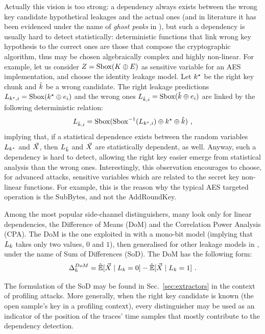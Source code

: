 \begin{remark}\label{rem:ghost}
Actually this vision is too strong: a dependency always exists between the wrong key candidate hypothetical leakages and the actual ones (and in literature it has been evidenced under the name of \emph{ghost peaks} in \cite{brier2004correlation}), but such a dependency is usually hard to detect statistically: deterministic functions that link wrong key hypothesis to the correct ones are those that compose the cryptographic algorithm, thus may be chosen algebraically complex and highly non-linear. For example, let us consider $Z = \mathrm{Sbox}(K \oplus E)$ as sensitive variable for an AES implementation, and choose the identity leakage model. Let $k^\star$ be the right key chunk and $\hat{k}$ be a wrong candidate. The right leakage predictions $L_{k^\star, i} = \mathrm{Sbox}(k^\star \oplus e_i)$ and the wrong ones $L_{\hat{k}, i} = \mathrm{Sbox}(\hat{k} \oplus e_i)$ are linked by the following deterministic relation: 
\begin{equation*}
L_{\hat{k}, i} = \mathrm{Sbox}(\mathrm{Sbox}^{-1}(L_{k^\star, i})\oplus k^\star \oplus \hat{k}) \mbox{ ,}
\end{equation*}
implying that, if a statistical dependence exists between the random variables $L_{k^\star}$ and $\vec{X}$, then $L_{\hat{k}}$ and $\vec{X}$ are statistically dependent, as well. Anyway, such a dependency is hard to detect, allowing the right key easier emerge from statistical analysis than the wrong ones. Interestingly, this observation encourages to choose, for advanced attacks, sensitive variables which are related to the secret key \via non-linear functions. For example, this is the reason why the typical AES targeted operation is the SubBytes, and not the AddRoundKey.
\end{remark}

Among the most popular side-channel distinguishers, many look only for linear dependencies, \eg the Difference of Means (DoM) and the Correlation Power Analysis (CPA). The DoM is the one exploited in \cite{kocher1999differential} with a mono-bit model (implying that $L_k$ takes only two values, $0$ and $1$), then generalised for other leakage models in \cite{Rechberger2005}, under the name of Sum of Differences (SoD). The DoM has the following form: 
\begin{equation}
\distinguisher^{DoM}_{\keyVar} = \esperEst[\given{\vaLeakVec}{\leakageModel_\keyVar = 0}] - \esperEst[\given{\vaLeakVec}{\leakageModel_\keyVar = 1}]   \mbox{ .}
\end{equation}
\begin{remark}
The formulation of the SoD may be found in Sec.~\ref{sec:extractors} in the context of profiling attacks. More generally, when the right key candidate is known (\eg the open sample's key in a profiling context), every distinguisher may be used as an indicator of the position of the traces' time samples that mostly contribute to the dependency detection.
\end{remark}

